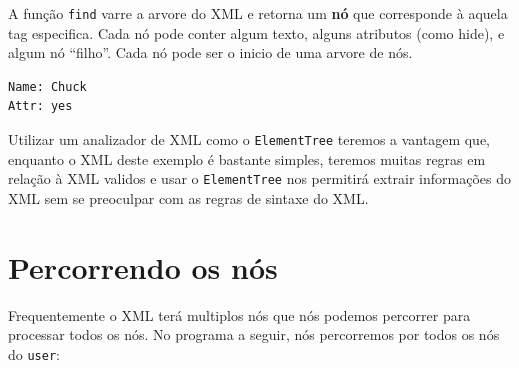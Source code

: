 A função {\tt find} varre a arvore do XML
e retorna um {\bf nó} que corresponde à aquela tag especifica.
Cada nó pode conter algum texto, alguns atributos (como hide), e
algum nó ``filho''. Cada nó pode ser o inicio de uma arvore de nós.

\beforeverb
\begin{verbatim}
Name: Chuck
Attr: yes
\end{verbatim}
\afterverb
%
Utilizar um analizador de XML como o {\tt ElementTree} teremos a
vantagem que, enquanto o XML deste exemplo é bastante simples, 
teremos muitas regras em relação à XML validos e usar o 
{\tt ElementTree} nos permitirá extrair informações do XML sem
se preoculpar com as regras de sintaxe do XML.

\section{Percorrendo os nós}

Frequentemente o XML terá multiplos nós que nós podemos percorrer
para processar todos os nós. No programa a seguir,
nós percorremos por todos os nós do {\tt user}:


